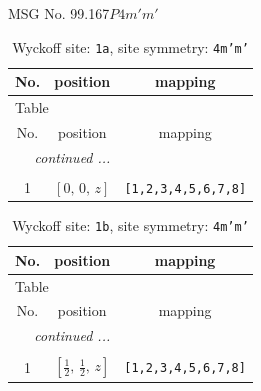 \documentclass[fleqn,8pt]{jsarticle}
\begin{document}
\setcounter{MaxMatrixCols}{32}

\renewcommand{\tablename}{Table~}
\renewcommand{\figurename}{Figure~}
\begin{center}
\LARGE
MSG No. 99.167\quad$P4m'm'$
\end{center}
\renewcommand{\arraystretch}{1.2}
\begin{longtable}{ccc}
\caption{Wyckoff site: {\tt 1a}, site symmetry: {\tt 4m'm'}}
 \\
 \hline \hline
No. & position & mapping \\ \hline \endfirsthead

\multicolumn{2}{l}{\tablename\ \thetable{}} \\
 \hline \hline
No. & position & mapping \\ \hline \endhead

 \hline \hline
\multicolumn{2}{r}{\footnotesize\it continued ...} \\ \endfoot

 \hline \hline
\multicolumn{2}{r}{} \\ \endlastfoot

1 & $\left[ 0,\, 0,\, z \right]$ & {\tt [1,2,3,4,5,6,7,8]} \\
\end{longtable}
\renewcommand{\arraystretch}{1.2}
\begin{longtable}{ccc}
\caption{Wyckoff site: {\tt 1b}, site symmetry: {\tt 4m'm'}}
 \\
 \hline \hline
No. & position & mapping \\ \hline \endfirsthead

\multicolumn{2}{l}{\tablename\ \thetable{}} \\
 \hline \hline
No. & position & mapping \\ \hline \endhead

 \hline \hline
\multicolumn{2}{r}{\footnotesize\it continued ...} \\ \endfoot

 \hline \hline
\multicolumn{2}{r}{} \\ \endlastfoot

1 & $\left[ \frac{1}{2},\, \frac{1}{2},\, z \right]$ & {\tt [1,2,3,4,5,6,7,8]} \\
\end{longtable}
\renewcommand{\arraystretch}{1.2}
\end{document}
